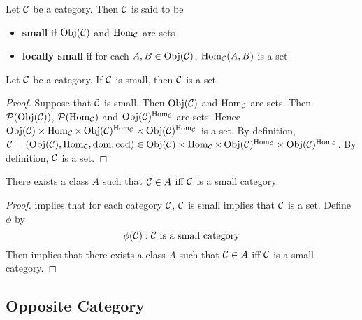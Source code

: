 \documentclass{book}
\begin{document}
	\begin{defn} 
		Let $\MC$ be a category. Then $\MC$ is said to be 
		\begin{itemize}
			\item \textbf{small} if $\Obj(\MC)$ and $\Hom_{\MC}$ are sets
			\item \textbf{locally small} if for each $A,B \in \Obj(\MC)$, $\Hom_{\MC}(A,B)$ is a set 
		\end{itemize}
	\end{defn}

	\begin{ex} 
		Let $\MC$ be a category. If $\MC$ is small, then $\MC$ is a set. 
	\end{ex}

	\begin{proof}
		Suppose that $\MC$ is small. Then $\Obj(\MC)$ and $\Hom_{\MC}$ are sets. Then $\MP(\Obj(\MC))$, $\MP(\Hom_{\MC})$ and $\Obj(\MC)^{\Hom_{\MC}}$ are sets. Hence $\Obj(\MC) \times \Hom_{\MC} \times \Obj(\MC)^{\Hom_{\MC}} \times \Obj(\MC)^{\Hom_{\MC}}$ is a set. By definition, $\MC = (\Obj(\MC), \Hom_{\MC}, \dom, \cod) \in \Obj(\MC) \times \Hom_{\MC} \times \Obj(\MC)^{\Hom_{\MC}} \times \Obj(\MC)^{\Hom_{\MC}}$. By definition, $\MC$ is a set. 
	\end{proof}
	
	\begin{ex} 
		There exists a class $A$ such that $\MC \in A$ iff $\MC$ is a small category. 
	\end{ex}

	\begin{proof}
		 implies that for each category $\MC$, $\MC$ is small implies that $\MC$ is a set. Define $\phi$ by $$\phi(\MC): \MC \text{ is a small category} $$ 
		Then  implies that there exists a class $A$ such that $\MC \in A$ iff $\MC$ is a small category.  
	\end{proof}





















	
	
	\subsection{Opposite Category}
\end{document}
